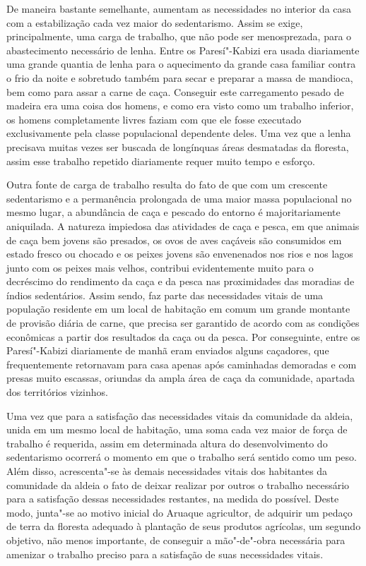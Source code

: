 De maneira bastante semelhante, aumentam as necessidades no interior da
casa com a estabilização cada vez maior do sedentarismo. Assim se exige,
principalmente, uma carga de trabalho, que não pode ser menosprezada,
para o abastecimento necessário de lenha. Entre os Paresí"-Kabizi era
usada diariamente uma grande quantia de lenha para o aquecimento da
grande casa familiar contra o frio da noite e sobretudo também para
secar e preparar a massa de mandioca, bem como para assar a carne de
caça. Conseguir este carregamento pesado de madeira era uma coisa dos
homens, e como era visto como um trabalho inferior, os homens
completamente livres faziam com que ele fosse executado exclusivamente
pela classe populacional dependente deles. Uma vez que a lenha
precisava muitas vezes ser buscada de longínquas áreas desmatadas da
floresta, assim esse trabalho repetido diariamente requer muito tempo e
esforço.

Outra fonte de carga de trabalho resulta do fato de que com um crescente
sedentarismo e a permanência prolongada de uma maior massa populacional
no mesmo lugar, a abundância de caça e pescado do entorno é
majoritariamente aniquilada. A natureza impiedosa das atividades de caça
e pesca, em que animais de caça bem jovens são presados, os ovos de
aves caçáveis são consumidos em estado fresco ou chocado e os peixes
jovens são envenenados nos rios e nos lagos junto com os peixes mais
velhos, contribui evidentemente muito para o decréscimo do rendimento da
caça e da pesca nas proximidades das moradias de índios sedentários.
Assim sendo, faz parte das necessidades vitais de uma população
residente em um local de habitação em comum um grande montante de
provisão diária de carne, que precisa ser garantido de acordo com as
condições econômicas a partir dos resultados da caça ou da pesca. Por
conseguinte, entre os Paresí"-Kabizi diariamente de manhã eram enviados
alguns caçadores, que frequentemente retornavam para casa apenas após
caminhadas demoradas e com presas muito escassas, oriundas da ampla
área de caça da comunidade, apartada dos territórios vizinhos.

Uma vez que para a satisfação das necessidades vitais da comunidade da
aldeia, unida em um mesmo local de habitação, uma soma cada vez maior de
força de trabalho é requerida, assim em determinada altura do
desenvolvimento do sedentarismo ocorrerá o momento em que o trabalho
será sentido como um peso. Além disso, acrescenta"-se às demais
necessidades vitais dos habitantes da comunidade da aldeia o fato de
deixar realizar por outros o trabalho necessário para a satisfação
dessas necessidades restantes, na medida do possível. Deste modo,
junta"-se ao motivo inicial do Aruaque agricultor, de adquirir um pedaço
de terra da floresta adequado à plantação de seus produtos agrícolas, um
segundo objetivo, não menos importante, de conseguir a mão"-de"-obra
necessária para amenizar o trabalho preciso para a satisfação de suas
necessidades vitais.

